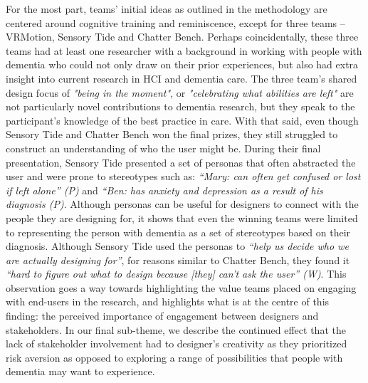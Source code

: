 For the most part, teams' initial ideas as outlined in the methodology are centered around cognitive training and reminiscence, except for three teams – VRMotion, Sensory Tide and Chatter Bench. Perhaps coincidentally, these three teams had at least one researcher with a background in working with people with dementia who could not only draw on their prior experiences, but also had extra insight into current research in HCI and dementia care. The three team’s shared design focus of \textit{"being in the moment"}, or \textit{"celebrating what abilities are left"} are not particularly novel contributions to dementia research, but they speak to the participant’s knowledge of the best practice in care. With that said, even though Sensory Tide and Chatter Bench won the final prizes, they still struggled to construct an understanding of who the user might be. During their final presentation, Sensory Tide presented a set of personas that often abstracted the user and were prone to stereotypes such as: \textit{“Mary: can often get confused or lost if left alone” (P)} and \textit{“Ben: has anxiety and depression as a result of his diagnosis (P)}. Although personas can be useful for designers to connect with the people they are designing for, it shows that even the winning teams were limited to representing the person with dementia as a set of stereotypes based on their diagnosis. Although Sensory Tide used the personas to \textit{“help us decide who we are actually designing for”}, for reasons similar to Chatter Bench, they found it \textit{“hard to figure out what to design because [they] can’t ask the user” (W)}. This observation goes a way towards highlighting the value teams placed on engaging with end-users in the research, and highlights what is at the centre of this finding: the perceived importance of engagement between designers and stakeholders. In our final sub-theme, we describe the continued effect that the lack of stakeholder involvement had to designer’s creativity as they prioritized risk aversion as opposed to exploring a range of possibilities that people with dementia may want to experience. 
